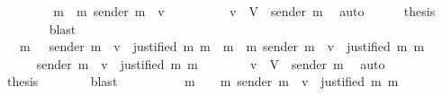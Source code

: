 \begin{isabellebody}
\ \ \isamarkupfalse%
{\isacharminus}\isanewline
\ \ \ \ \isamarkupfalse%
\ {\isachardoublequoteopen}{\isacharbraceleft}m{\isacharprime}{\isacharprime}\ {\isasymin}\ {\isacharbraceleft}m{\isacharprime}{\isacharbraceright}{\isachardot}\ sender\ m{\isacharprime}{\isacharprime}\ {\isacharequal}\ v{\isacharbraceright}\ {\isacharequal}\ {\isasymemptyset}{\isachardoublequoteclose}\isanewline
\ \ \ \ \ \ \isamarkupfalse%
\ {\isacartoucheopen}v\ {\isasymin}\ V\ {\isacharminus}\ {\isacharbraceleft}sender\ m{\isacharprime}{\isacharbraceright}{\isacartoucheclose}\ \isamarkupfalse%
\ auto\isanewline
\ \ \ \ \isamarkupfalse%
\ {\isacharquery}thesis\isanewline
\ \ \ \ \ \ \isamarkupfalse%
\ blast\isanewline
\ \ \isamarkupfalse%
\isanewline
\ \ \isamarkupfalse%
\ \isamarkupfalse%
\ {\isachardoublequoteopen}{\isasymdots}\ {\isacharequal}\ {\isacharbraceleft}m{\isacharprime}{\isacharprime}\ {\isasymin}\ {\isasymsigma}{\isachardot}\ sender\ m{\isacharprime}{\isacharprime}\ {\isacharequal}\ v\ {\isasymand}\ justified\ m\ m{\isacharprime}{\isacharprime}{\isacharbraceright}\ {\isasymunion}\ {\isacharbraceleft}m{\isacharprime}{\isacharprime}\ {\isasymin}\ {\isacharbraceleft}m{\isacharprime}{\isacharbraceright}{\isachardot}\ sender\ m{\isacharprime}{\isacharprime}\ {\isacharequal}\ v\ {\isasymand}\ justified\ m\ m{\isacharprime}{\isacharprime}{\isacharbraceright}{\isachardoublequoteclose}\isanewline
\ \ \isamarkupfalse%
{\isacharminus}\isanewline
\ \ \ \ \isamarkupfalse%
\ {\isachardoublequoteopen}sender\ m{\isacharprime}\ {\isacharequal}\ v\ {\isasymLongrightarrow}\ justified\ m\ m{\isacharprime}{\isachardoublequoteclose}\isanewline
\ \ \ \ \ \ \isamarkupfalse%
\ {\isacartoucheopen}v\ {\isasymin}\ V\ {\isacharminus}\ {\isacharbraceleft}sender\ m{\isacharprime}{\isacharbraceright}{\isacartoucheclose}\ \isamarkupfalse%
\ auto\isanewline
\ \ \ \ \isamarkupfalse%
\ {\isacharquery}thesis\isanewline
\ \ \ \ \ \ \isamarkupfalse%
\ blast\isanewline
\ \ \isamarkupfalse%
\isanewline
\ \ \isamarkupfalse%
\ \isamarkupfalse%
\ {\isachardoublequoteopen}{\isasymdots}\ {\isacharequal}\ {\isacharbraceleft}m{\isacharprime}{\isacharprime}\ {\isasymin}\ {\isasymsigma}\ {\isasymunion}\ {\isacharbraceleft}m{\isacharprime}{\isacharbraceright}{\isachardot}\ sender\ m{\isacharprime}{\isacharprime}\ {\isacharequal}\ v\ {\isasymand}\ justified\ m\ m{\isacharprime}{\isacharprime}{\isacharbraceright}{\isachardoublequoteclose}\isanewline

\end{isabellebody}
